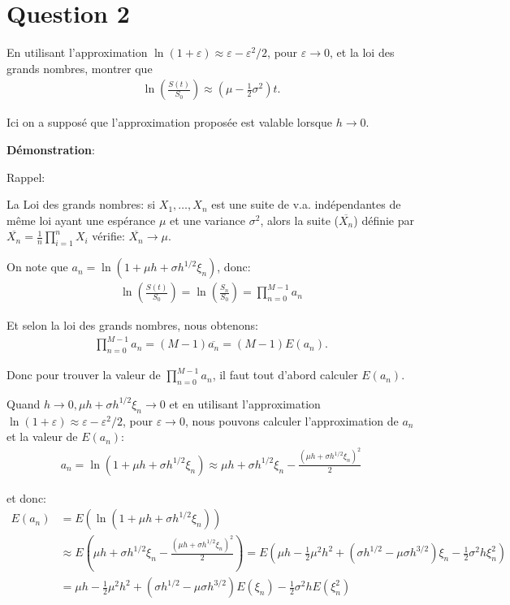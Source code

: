 \documentclass[a4paper,10pt]{report}
\begin{document}
\section{Question 2}
En utilisant l'approximation $\ln (1 + \varepsilon) \approx \varepsilon - \varepsilon^{2} / 2$, pour $\varepsilon \rightarrow 0$, et la loi des grands nombres, montrer que
\begin{align*}
	\ln(\frac{S(t)}{S_{0}}) \approx (\mu - \frac{1}{2} \sigma^{2})t.
\end{align*}
\par Ici on a supposé que l'approximation proposée est valable lorsque $h \rightarrow 0$.

\noindent \textbf{Démonstration}:
\par Rappel: 
\par La Loi des grands nombres: si $X_{1}, \dots, X_{n}$ est une suite de v.a. indépendantes de même loi ayant une espérance $\mu$ et une variance $\sigma^{2}$, alors la suite ($\overline{X_{n}}$) définie par $\overline{X_{n}} = \frac{1}{n} \prod_{i=1}^{n}X_{i}$ vérifie: $\overline{X_{n}} \rightarrow \mu$.
\par On note que $a_{n} = \ln (1 + \mu h + \sigma h^{1/2} \xi_{n})$, donc:
\begin{align*}
	\ln (\frac{S(t)}{S_{0}}) = \ln (\frac{S_{n}}{S_{0}}) = \prod_{n=0}^{M-1} a_{n}
\end{align*}
\par Et selon la loi des grands nombres, nous obtenons:
\begin{align*} 
\prod_{n=0}^{M-1} a_{n} = (M-1) \overline{a_{n}} = (M-1) E(a_{n}).
\end{align*} 
\par Donc pour trouver la valeur de $\prod_{n=0}^{M-1} a_{n}$, il faut tout d'abord calculer $E(a_{n})$.
\par Quand $h \rightarrow 0, \mu h + \sigma h^{1/2} \xi_{n} \rightarrow 0$ et en utilisant l'approximation $\ln (1 + \varepsilon) \approx \varepsilon - \varepsilon^{2} / 2$, pour $\varepsilon \rightarrow 0$, nous pouvons calculer l'approximation de $a_{n}$ et la valeur de $E(a_{n})$:
\begin{align*}
	a_{n} = \ln (1 + \mu h + \sigma h^{1/2} \xi_{n}) \approx \mu h +\sigma h^{1/2} \xi_{n} - \frac{(\mu h + \sigma h^{1/2} \xi_{n})^{2}}{2}
\end{align*}
\par et donc:
\begin{align*}
E(a_{n}) &= E(\ln (1 + \mu h + \sigma h^{1/2} \xi_{n})) \\
&\approx E(\mu h +\sigma h^{1/2} \xi_{n} - \frac{(\mu h + \sigma h^{1/2} \xi_{n})^{2}}{2}) = E(\mu h -\frac{1}{2} \mu^{2} h^{2} + (\sigma h^{1/2} - \mu \sigma h^{3/2}) \xi_{n} -\frac{1}{2} \sigma^{2} h \xi_{n}^{2})\\
&= \mu h -\frac{1}{2} \mu^{2} h^{2} + (\sigma h^{1/2} - \mu \sigma h^{3/2}) E(\xi_{n}) -\frac{1}{2} \sigma^{2} h E(\xi_{n}^{2})
\end{align*}
\end{document}
